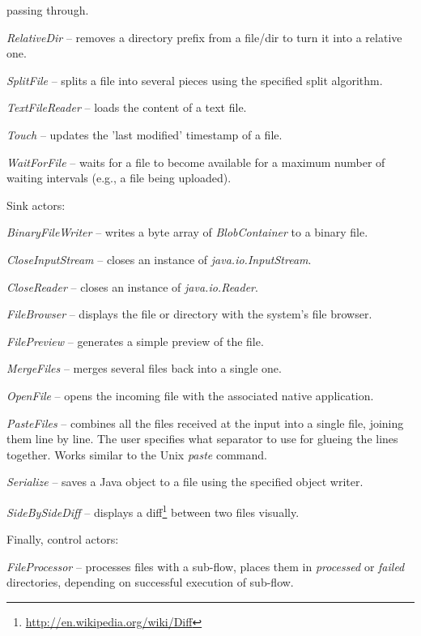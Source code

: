 \begin{tight_itemize}
	passing through.
	\item \textit{RelativeDir} -- removes a directory prefix from a file/dir
	to turn it into a relative one.
	\item \textit{SplitFile} -- splits a file into several pieces using the
	specified split algorithm.
	\item \textit{TextFileReader} -- loads the content of a text file.
	\item \textit{Touch} -- updates the 'last modified' timestamp of a file.
	\item \textit{WaitForFile} -- waits for a file to become available for
	a maximum number of waiting intervals (e.g., a file being uploaded).
\end{tight_itemize}
Sink actors:
\begin{tight_itemize}
	\item \textit{BinaryFileWriter} -- writes a byte array of
	\textit{BlobContainer} to a binary file.
	\item \textit{CloseInputStream} -- closes an instance of \textit{java.io.InputStream}.
	\item \textit{CloseReader} -- closes an instance of \textit{java.io.Reader}.
	\item \textit{FileBrowser} -- displays the file or directory with the system's file browser.
	\item \textit{FilePreview} -- generates a simple preview of the file.
	\item \textit{MergeFiles} -- merges several files back into a single one.
	\item \textit{OpenFile} -- opens the incoming file with the associated
	native application.
	\item \textit{PasteFiles} -- combines all the files received at the input into
	a single file, joining them line by line. The user specifies what separator to
	use for glueing the lines together. Works similar to the Unix \textit{paste}
	command.
	\item \textit{Serialize} -- saves a Java object to a file using the specified object writer.
	\item \textit{SideBySideDiff} -- displays a diff\footnote{\url{http://en.wikipedia.org/wiki/Diff}{}}
	between two files visually.
\end{tight_itemize}
Finally, control actors:
\begin{tight_itemize}
	\item \textit{FileProcessor} -- processes files with a sub-flow, places
	them in \textit{processed} or \textit{failed} directories, depending on
	successful execution of sub-flow.
\end{tight_itemize}

